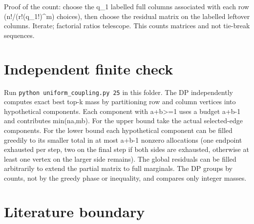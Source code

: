 \documentclass[11pt]{article}
\begin{document}
Proof of the count: choose the q\_1 labelled full columns associated with each row (n!/(r!(q\_1!)\^{}m) choices), then choose the residual matrix on the labelled leftover columns. Iterate; factorial ratios telescope. This counts matrices and not tie-break sequences.

\section{Independent finite check}\label{independent-finite-check}

Run \texttt{python\ uniform\_coupling.py\ 25} in this folder. The DP independently computes exact best top-k mass by partitioning row and column vertices into hypothetical components. Each component with a+b\textgreater=1 uses a budget a+b-1 and contributes min(na,mb). For the upper bound take the actual selected-edge components. For the lower bound each hypothetical component can be filled greedily to its smaller total in at most a+b-1 nonzero allocations (one endpoint exhausted per step, two on the final step if both sides are exhausted, otherwise at least one vertex on the larger side remains). The global residuals can be filled arbitrarily to extend the partial matrix to full marginals. The DP groups by counts, not by the greedy phase or inequality, and compares only integer masses.

\section{Literature boundary}\label{literature-boundary}
\end{document}

